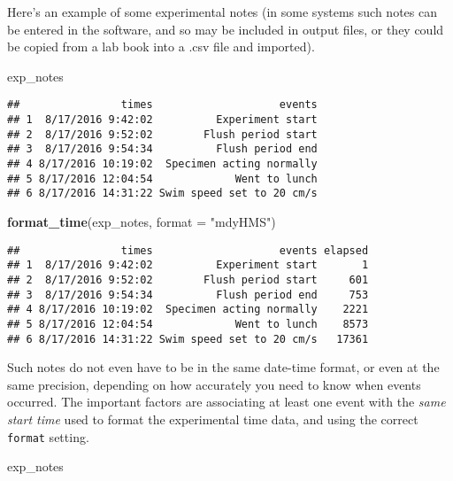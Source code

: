 \documentclass[]{book}
\newenvironment{Shaded}{\begin{snugshade}}{\end{snugshade}}
\newcommand{\KeywordTok}[1]{\textcolor[rgb]{0.13,0.29,0.53}{\textbf{#1}}}
\newcommand{\DataTypeTok}[1]{\textcolor[rgb]{0.13,0.29,0.53}{#1}}
\newcommand{\StringTok}[1]{\textcolor[rgb]{0.31,0.60,0.02}{#1}}
\newcommand{\NormalTok}[1]{#1}
\begin{document}
Here's an example of some experimental notes (in some systems such notes
can be entered in the software, and so may be included in output files,
or they could be copied from a lab book into a .csv file and imported).

\begin{Shaded}
\begin{Highlighting}[]
\NormalTok{exp_notes}
\end{Highlighting}
\end{Shaded}

\begin{verbatim}
##                times                    events
## 1  8/17/2016 9:42:02          Experiment start
## 2  8/17/2016 9:52:02        Flush period start
## 3  8/17/2016 9:54:34          Flush period end
## 4 8/17/2016 10:19:02  Specimen acting normally
## 5 8/17/2016 12:04:54             Went to lunch
## 6 8/17/2016 14:31:22 Swim speed set to 20 cm/s
\end{verbatim}

\begin{Shaded}
\begin{Highlighting}[]
\KeywordTok{format_time}\NormalTok{(exp_notes, }\DataTypeTok{format =} \StringTok{"mdyHMS"}\NormalTok{)}
\end{Highlighting}
\end{Shaded}

\begin{verbatim}
##                times                    events elapsed
## 1  8/17/2016 9:42:02          Experiment start       1
## 2  8/17/2016 9:52:02        Flush period start     601
## 3  8/17/2016 9:54:34          Flush period end     753
## 4 8/17/2016 10:19:02  Specimen acting normally    2221
## 5 8/17/2016 12:04:54             Went to lunch    8573
## 6 8/17/2016 14:31:22 Swim speed set to 20 cm/s   17361
\end{verbatim}

Such notes do not even have to be in the same date-time format, or even
at the same precision, depending on how accurately you need to know when
events occurred. The important factors are associating at least one
event with the \emph{same start time} used to format the experimental
time data, and using the correct \texttt{format} setting.

\begin{Shaded}
\begin{Highlighting}[]
\NormalTok{exp_notes}
\end{Highlighting}
\end{Shaded}
\end{document}
